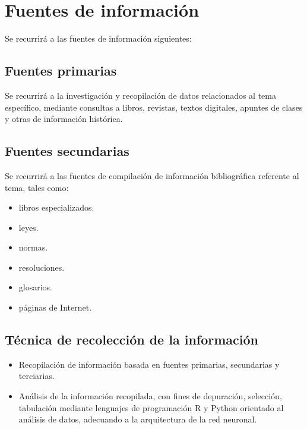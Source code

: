 \documentclass[
  12pt,
]{article}
\providecommand{\tightlist}{%
  \setlength{\itemsep}{0pt}\setlength{\parskip}{0pt}}
\begin{document}
\newpage


\newpage

\hypertarget{fuentes-de-informaciuxf3n}{%
\section{Fuentes de información}\label{fuentes-de-informaciuxf3n}}

Se recurrirá a las fuentes de información siguientes:

\hypertarget{fuentes-primarias}{%
\subsection{Fuentes primarias}\label{fuentes-primarias}}

Se recurrirá a la investigación y recopilación de datos relacionados al
tema específico, mediante consultas a libros, revistas, textos
digitales, apuntes de clases y otras de información histórica.

\hypertarget{fuentes-secundarias}{%
\subsection{Fuentes secundarias}\label{fuentes-secundarias}}

Se recurrirá a las fuentes de compilación de información bibliográfica
referente al tema, tales como:

\begin{itemize}
\tightlist
\item
  libros especializados.
\item
  leyes.
\item
  normas.
\item
  resoluciones.
\item
  glosarios.
\item
  páginas de Internet.
\end{itemize}

\hypertarget{tuxe9cnica-de-recolecciuxf3n-de-la-informaciuxf3n}{%
\subsection{Técnica de recolección de la
información}\label{tuxe9cnica-de-recolecciuxf3n-de-la-informaciuxf3n}}

\begin{itemize}
\tightlist
\item
  Recopilación de información basada en fuentes primarias, secundarias y
  terciarias.
\item
  Análisis de la información recopilada, con fines de depuración,
  selección, tabulación mediante lenguajes de programación R y Python
  orientado al análisis de datos, adecuando a la arquitectura de la red
  neuronal.
\end{itemize}
\end{document}
